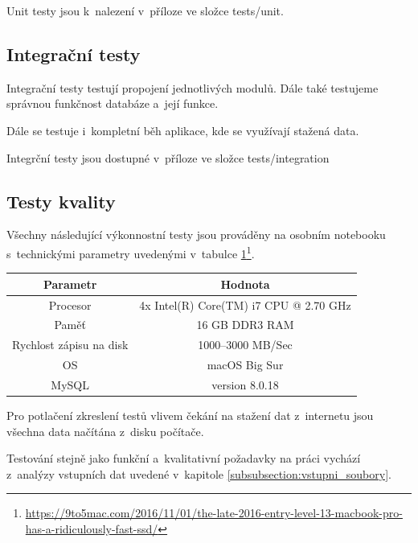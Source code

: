 Unit testy jsou k~nalezení v~příloze ve složce tests/unit.


\subsection{Integrační testy}

Integrační testy testují propojení jednotlivých modulů. Dále také testujeme správnou funkčnost databáze a~její funkce.

\bigbreak

Dále se testuje i~kompletní běh aplikace, kde se využívají stažená data.

\bigbreak

Integrční testy jsou dostupné v~příloze ve složce tests/integration


\subsection{Testy kvality}


Všechny následující výkonnostní testy jsou prováděny na osobním notebooku s~technickými parametry uvedenými v~tabulce \ref{table:hw}\footnote{\url{https://9to5mac.com/2016/11/01/the-late-2016-entry-level-13-macbook-pro-has-a-ridiculously-fast-ssd/}}.


\begin{center}
   \begin{table}[ht]
\centering
\begin{tabular}{|c|c|}
\hline
Parametr & Hodnota \\ \hline \hline
Procesor & 4x Intel(R) Core(TM) i7 CPU @ 2.70 GHz\\ \hline
Paměť & 16 GB DDR3 RAM  \\  \hline
Rychlost zápisu na disk & 1000--3000 MB/Sec \\ \hline
OS & macOS Big Sur\\ \hline
MySQL & version 8.0.18\\ \hline
\end{tabular}
\label{table:hw}
\end{table}
\end{center}


\bigbreak

Pro potlačení zkreslení testů vlivem čekání na stažení dat z~internetu jsou všechna data načítána z~disku počítače.


\bigbreak

Testování stejně jako funkční a~kvalitativní požadavky na práci vychází z~analýzy vstupních dat uvedené v~kapitole \ref{subsubsection:vstupni_soubory}.


